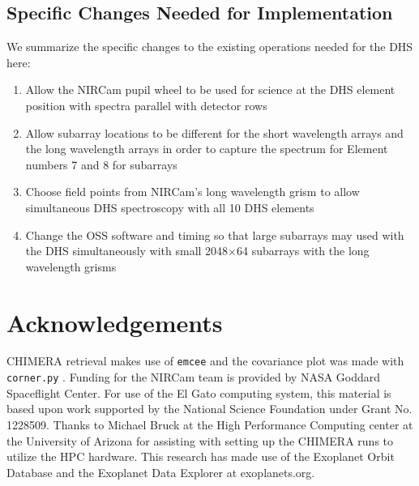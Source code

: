 \documentclass[iop]{emulateapj}
\begin{document}
\subsection{Specific Changes Needed for Implementation}
We summarize the specific changes to the existing operations needed for the DHS here:
\begin{enumerate}
\item Allow the NIRCam pupil wheel to be used for science at the DHS element position with spectra parallel with detector rows
\item Allow subarray locations to be different for the short wavelength arrays and the long wavelength arrays in order to capture the spectrum for Element numbers 7 and 8 for subarrays
\item Choose field points from NIRCam's long wavelength grism to allow simultaneous DHS spectroscopy with all 10 DHS elements
\item Change the OSS software and timing so that large subarrays may used with the DHS simultaneously with small 2048$\times$64 subarrays with the long wavelength grisms
\end{enumerate}

\vspace{0.1in}
\section*{Acknowledgements}

CHIMERA retrieval makes use of \texttt{emcee} \citep{foreman-mackey2013emcee} and the covariance plot was made with \texttt{corner.py} \citep{foremanCorner}.
Funding for the NIRCam team is provided by NASA Goddard Spaceflight Center.
For use of the El Gato computing system, this material is based upon work supported by the National Science Foundation under Grant No. 1228509.
Thanks to Michael Bruck at the High Performance Computing center at the University of Arizona for assisting with setting up the CHIMERA runs to utilize the HPC hardware.
This research has made use of the Exoplanet Orbit Database and the Exoplanet Data Explorer at exoplanets.org.

\end{document}
